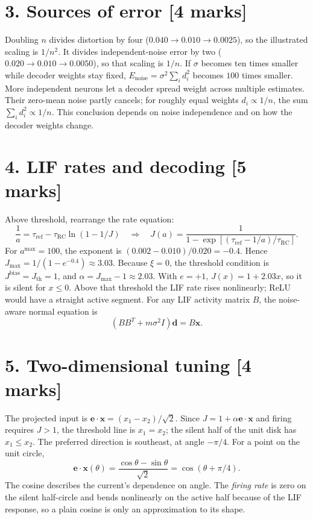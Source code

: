 \documentclass[10pt,letterpaper]{article}
\newcommand{\vct}[1]{\boldsymbol{#1}}
\begin{document}
\section*{3. Sources of error [4 marks]}
Doubling \(n\) divides distortion by four (\(0.040\to0.010\to0.0025\)), so the illustrated scaling is \(1/n^2\). It divides independent-noise error by two (\(0.020\to0.010\to0.0050\)), so that scaling is \(1/n\). If \(\sigma\) becomes ten times smaller while decoder weights stay fixed, \(E_{\mathrm{noise}}=\sigma^2\sum_i d_i^2\) becomes \(100\) times smaller. More independent neurons let a decoder spread weight across multiple estimates. Their zero-mean noise partly cancels; for roughly equal weights \(d_i\propto1/n\), the sum \(\sum_i d_i^2\propto1/n\). This conclusion depends on noise independence and on how the decoder weights change.

\newpage
\section*{4. LIF rates and decoding [5 marks]}
Above threshold, rearrange the rate equation:
\[
\frac1a=\tau_{\mathrm{ref}}-\tau_{\mathrm{RC}}\ln(1-1/J)
\quad\Longrightarrow\quad
\boxed{J(a)=\frac{1}{1-\exp[(\tau_{\mathrm{ref}}-1/a)/\tau_{\mathrm{RC}}]}}.
\]
For \(a^{\max}=100\), the exponent is \((0.002-0.010)/0.020=-0.4\). Hence \(J_{\max}=1/(1-e^{-0.4})\approx3.03\). Because \(\xi=0\), the threshold condition is \(J^{\mathrm{bias}}=J_{\mathrm{th}}=1\), and \(\alpha=J_{\max}-1\approx2.03\).
With \(e=+1\), \(J(x)=1+2.03x\), so it is silent for \(x\leq0\). Above that threshold the LIF rate rises nonlinearly; ReLU would have a straight active segment. For any LIF activity matrix \(B\), the noise-aware normal equation is
\[
\boxed{(BB^T+m\sigma^2 I)\vct{d}=B\vct{x}}.
\]

\section*{5. Two-dimensional tuning [4 marks]}
The projected input is \(\vct{e}\cdot\vct{x}=(x_1-x_2)/\sqrt2\). Since \(J=1+\alpha\vct{e}\cdot\vct{x}\) and firing requires \(J>1\), the threshold line is \(x_1=x_2\); the silent half of the unit disk has \(x_1\leq x_2\). The preferred direction is southeast, at angle \(-\pi/4\). For a point on the unit circle,
\[
\vct{e}\cdot\vct{x}(\theta)=\frac{\cos\theta-\sin\theta}{\sqrt2}
=\boxed{\cos(\theta+\pi/4)}.
\]
The cosine describes the current's dependence on angle. The \emph{firing rate} is zero on the silent half-circle and bends nonlinearly on the active half because of the LIF response, so a plain cosine is only an approximation to its shape.
\end{document}
